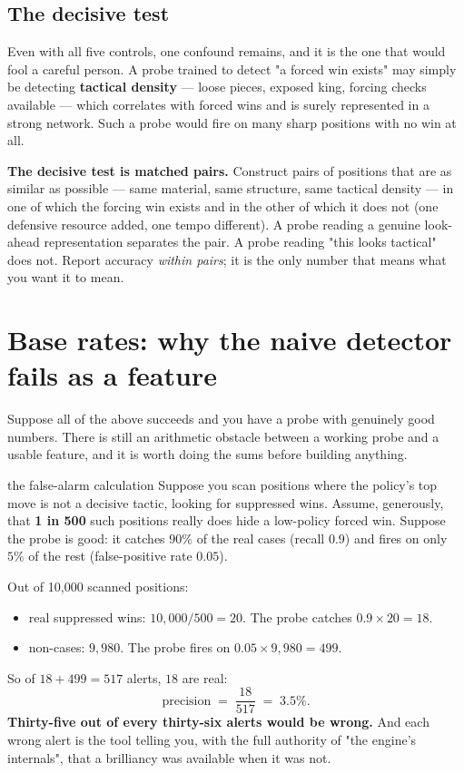 \subsection{The decisive test}

Even with all five controls, one confound remains, and it is the one that would fool a careful
person. A probe trained to detect "a forced win exists" may simply be detecting
\textbf{tactical density} --- loose pieces, exposed king, forcing checks available --- which
correlates with forced wins and is surely represented in a strong network. Such a probe would
fire on many sharp positions with no win at all.

\begin{keyidea}
\textbf{The decisive test is matched pairs.} Construct pairs of positions that are as similar
as possible --- same material, same structure, same tactical density --- in one of which the
forcing win exists and in the other of which it does not (one defensive resource added, one
tempo different). A probe reading a genuine look-ahead representation separates the pair. A
probe reading "this looks tactical" does not. Report accuracy \emph{within pairs}; it is the
only number that means what you want it to mean.
\end{keyidea}

\section{Base rates: why the naive detector fails as a feature}

Suppose all of the above succeeds and you have a probe with genuinely good numbers. There is
still an arithmetic obstacle between a working probe and a usable feature, and it is worth
doing the sums before building anything.

\begin{worked}{the false-alarm calculation}
Suppose you scan positions where the policy's top move is not a decisive tactic, looking for
suppressed wins. Assume, generously, that \textbf{1 in 500} such positions really does hide a
low-policy forced win. Suppose the probe is good: it catches $90\%$ of the real cases (recall
$0.9$) and fires on only $5\%$ of the rest (false-positive rate $0.05$).

Out of 10{,}000 scanned positions:
\begin{itemize}
\item real suppressed wins: $10{,}000/500 = 20$. The probe catches $0.9 \times 20 = 18$.
\item non-cases: $9{,}980$. The probe fires on $0.05 \times 9{,}980 = 499$.
\end{itemize}
So of $18 + 499 = 517$ alerts, $18$ are real:
\[
  \text{precision} \;=\; \frac{18}{517} \;=\; 3.5\% .
\]
\textbf{Thirty-five out of every thirty-six alerts would be wrong.} And each wrong alert is
the tool telling you, with the full authority of "the engine's internals", that a brilliancy
was available when it was not.
\end{worked}

